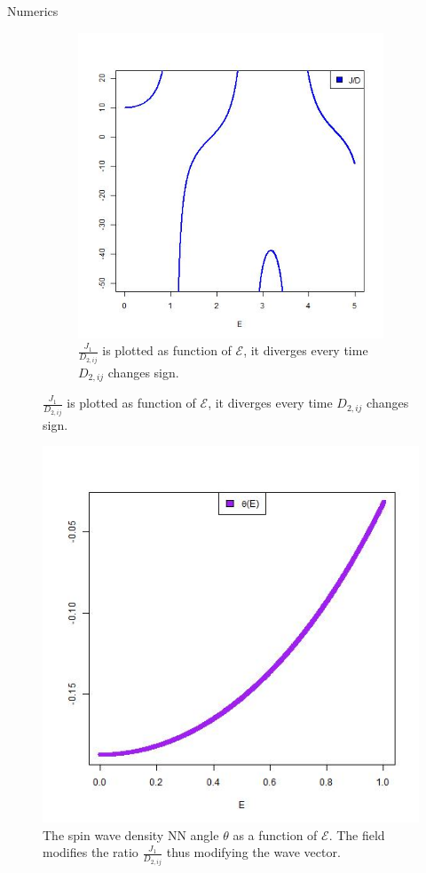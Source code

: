 \begin{section}{Numerics}
\begin{figure}
\begin{subfigure}{.5\textwidth}
  \centering
  \includegraphics[width=1\linewidth]{Chapters/ratio.jpg}
  \caption{$\frac{J_{1}}{D_{2,ij}}$ is plotted as function of $\mathcal{E}$, it diverges every time $D_{2,ij}$ changes sign.}
  \label{Fig1:ratio}
\end{subfigure}
\label{Fig1}
\end{figure}

\begin{figure}
\centering
  \includegraphics[width=0.5\linewidth]{Chapters/theta.jpg}
  \caption{The spin wave density NN angle $\theta$ as a function of $\mathcal{E}$. The field modifies the ratio $\frac{J_{1}}{D_{2,ij}}$ thus modifying the wave vector.}
\label{Fig2}
\end{figure}

\end{section}
